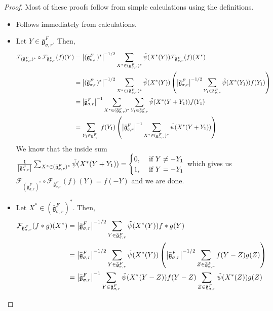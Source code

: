 \documentclass[11 pt]{article}
\numberwithin{equation}{subsection}
\theoremstyle{definition}
\theoremstyle{remark}
\theoremstyle{conjecture}
\newcommand{\bg}{\bar{\mathfrak g}}
\newcommand{\mcF}{\mathcal F}
\begin{document}
\begin{proof}
    Most of these proofs follow from simple calculations using the definitions.
    \begin{itemize}
       \item[(i)]  Follows immediately from calculations.
        \item [(ii)] Let $Y \in \bg_{\sigma,r}^F$. Then, \begin{align*}
            \mcF_{(\bg_{\sigma,r}^F)^*}\circ\mcF_{\bg_{\sigma,r}^F}(f)(Y)& =\left|(\bg_{\sigma,r}^F)^*\right|^{-1/2}\sum_{X^*\in (\bg_{\sigma,r}^F)^*}\Tilde\psi( X^*(Y))\mcF_{\bg_{\sigma,r}^F}(f)(X^*)\\
            &= \left|(\bg_{\sigma,r}^F)^*\right|^{-1/2}\sum_{X^*\in (\bg_{\sigma,r}^F)^*}\Tilde\psi( X^*(Y)) \left(\left|\bg_{\sigma,r}^F\right|^{-1/2}\sum_{Y_1\in \bg_{\sigma,r}^F}\Tilde\psi( X^*(Y_1))f(Y_1)\right)\\
            &= \left|\bg_{\sigma,r}^F\right|^{-1}\sum_{X^*\in (\bg_{\sigma,r}^F)^*}\sum_{Y_1\in \bg_{\sigma,r}^F}\Tilde\psi( X^*(Y+Y_1)) f(Y_1)\\
            &= \sum_{Y_1\in \bg_{\sigma,r}^F}f(Y_1)\left( \left|\bg_{\sigma,r}^F\right|^{-1} \sum_{X^*\in (\bg_{\sigma,r}^F)^*} \Tilde\psi( X^*(Y+Y_1))\right)
        \end{align*}
        We know that the inside sum $ \frac{1}{\left|\bg_{\sigma,r}^F\right|}\sum_{X^*\in (\bg_{\sigma,r}^F)^*} \Tilde\psi( X^*(Y+Y_1))= \begin{cases} 0, & \text{ if } Y \neq -Y_1\\
        1, &\text{ if } Y = -Y_1\\
        \end{cases}$ which gives us $\mcF_{(\bg_{\sigma,r}^F)^*}\circ\mcF_{\bg_{\sigma,r}^F}(f)(Y)= f (-Y)$ and we are done. 
        \item[(iii)] Let $X^* \in (\bg_{\sigma,r}^F)^*$. Then, 
        \begin{align*}
            \mcF_{\bg_{\sigma,r}^F}(f*g)(X^*)&= \left|\bg_{\sigma,r}^F\right|^{-1/2}\sum_{Y\in \bg_{\sigma,r}^F}\Tilde\psi( X^*(Y))f*g(Y)\\
            &= \left|\bg_{\sigma,r}^F\right|^{-1/2}\sum_{Y\in \bg_{\sigma,r}^F}\Tilde\psi( X^*(Y))\left( \left|\bg_{\sigma,r}^F\right|^{-1/2}\sum_{Z\in \bg_{\sigma,r}^F}f(Y-Z)g(Z)\right)\\
            &= \left|\bg_{\sigma,r}^F\right|^{-1} \sum_{Y\in \bg_{\sigma,r}^F}\Tilde\psi( X^*(Y-Z))f(Y-Z)\sum_{Z\in \bg_{\sigma,r}^F}\Tilde\psi( X^*(Z))g(Z)\\

\end{align*}
\end{itemize}
\end{proof}
\end{document}
